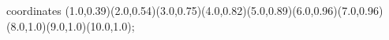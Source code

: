 					coordinates { (1.0,0.39)(2.0,0.54)(3.0,0.75)(4.0,0.82)(5.0,0.89)(6.0,0.96)(7.0,0.96)(8.0,1.0)(9.0,1.0)(10.0,1.0)};